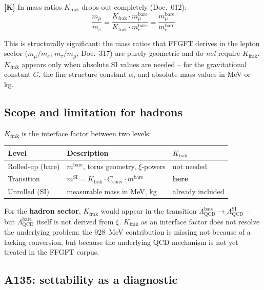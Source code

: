 \textbf{[K]} In mass ratios $K_{\text{frak}}$ drops out completely
(Doc.~012):
\begin{equation}
  \frac{m_\mu}{m_e} = \frac{K_{\text{frak}} \cdot m_\mu^{\text{bare}}}
  {K_{\text{frak}} \cdot m_e^{\text{bare}}} = \frac{m_\mu^{\text{bare}}}{m_e^{\text{bare}}}
\end{equation}

This is structurally significant: the mass ratios that FFGFT derives in
the lepton sector ($m_\mu/m_e$, $m_\tau/m_\mu$, Doc.~317) are purely
geometric and do \emph{not} require $K_{\text{frak}}$. $K_{\text{frak}}$
appears only when absolute SI values are needed -- for the gravitational
constant $G$, the fine-structure constant $\alpha$, and absolute mass
values in MeV or kg.

\subsection{Scope and limitation for hadrons}

$K_{\text{frak}}$ is the interface factor between two levels:
\begin{center}
\begin{tabular}{lll}
\toprule
Level & Description & $K_{\text{frak}}$ \\
\midrule
Rolled-up (bare) & $m^{\text{bare}}$, torus geometry, $\xi$-powers
  & not needed \\
Transition & $m^{\text{SI}} = K_{\text{frak}} \cdot C_{\text{conv}} \cdot m^{\text{bare}}$
  & \textbf{here} \\
Unrolled (SI) & measurable mass in MeV, kg & already included \\
\bottomrule
\end{tabular}
\end{center}

For the \textbf{hadron sector}, $K_{\text{frak}}$ would appear in the
transition $\Lambda_{\text{QCD}}^{\text{bare}} \to
\Lambda_{\text{QCD}}^{\text{SI}}$ -- but
$\Lambda_{\text{QCD}}^{\text{bare}}$ itself is not derived from $\xi$.
$K_{\text{frak}}$ as an interface factor does not resolve the underlying
problem: the $928$~MeV contribution is missing not because of a lacking
conversion, but because the underlying QCD mechanism is not yet treated
in the FFGFT corpus.

\subsection{A135: settability as a diagnostic}

